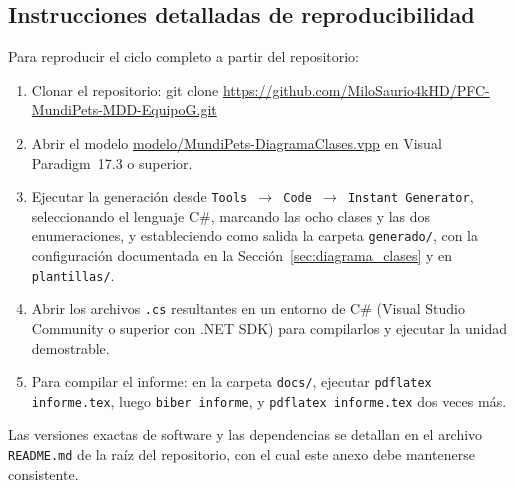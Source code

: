 \documentclass[journal,onecolumn]{IEEEtran}
\begin{document}
	\subsection*{Instrucciones detalladas de reproducibilidad}\label{sec:anexo_instrucciones}
	
	Para reproducir el ciclo completo a partir del repositorio:
	
	\begin{enumerate}[leftmargin=*, itemsep=2pt]
		\item Clonar el repositorio: git clone \url{https://github.com/MiloSaurio4kHD/PFC-MundiPets-MDD-EquipoG.git}
		\item Abrir el modelo \url*{modelo/MundiPets-DiagramaClases.vpp} en Visual Paradigm~17.3 o superior.
		\item Ejecutar la generación desde \texttt{Tools $\to$ Code $\to$ Instant Generator}, seleccionando el lenguaje C\#, marcando las ocho clases y las dos enumeraciones, y estableciendo como salida la carpeta \texttt{generado/}, con la configuración documentada en la Sección~\ref{sec:diagrama_clases} y en \texttt{plantillas/}.
		\item Abrir los archivos \texttt{.cs} resultantes en un entorno de C\# (Visual Studio Community o superior con .NET SDK) para compilarlos y ejecutar la unidad demostrable.
		\item Para compilar el informe: en la carpeta \texttt{docs/}, ejecutar \texttt{pdflatex informe.tex}, luego \texttt{biber informe}, y \texttt{pdflatex informe.tex} dos veces más.
	\end{enumerate}
	
	Las versiones exactas de software y las dependencias se detallan en el archivo \texttt{README.md} de la raíz del repositorio, con el cual este anexo debe mantenerse consistente.
	
\end{document}
